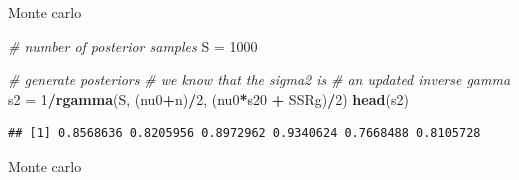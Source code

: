 \documentclass[ignorenonframetext,]{beamer}
\newenvironment{Shaded}{\begin{snugshade}}{\end{snugshade}}
\newcommand{\KeywordTok}[1]{\textcolor[rgb]{0.13,0.29,0.53}{\textbf{#1}}}
\newcommand{\DataTypeTok}[1]{\textcolor[rgb]{0.13,0.29,0.53}{#1}}
\newcommand{\DecValTok}[1]{\textcolor[rgb]{0.00,0.00,0.81}{#1}}
\newcommand{\StringTok}[1]{\textcolor[rgb]{0.31,0.60,0.02}{#1}}
\newcommand{\CommentTok}[1]{\textcolor[rgb]{0.56,0.35,0.01}{\textit{#1}}}
\newcommand{\OperatorTok}[1]{\textcolor[rgb]{0.81,0.36,0.00}{\textbf{#1}}}
\newcommand{\NormalTok}[1]{#1}
\begin{document}
\begin{frame}[fragile]{Monte carlo}

\begin{Shaded}
\begin{Highlighting}[]
\CommentTok{# number of posterior samples}
\NormalTok{S =}\StringTok{ }\DecValTok{1000}

\CommentTok{# generate posteriors}
\CommentTok{# we know that the sigma2 is}
\CommentTok{# an updated inverse gamma}
\NormalTok{s2 =}\StringTok{ }\DecValTok{1}\OperatorTok{/}\KeywordTok{rgamma}\NormalTok{(S, (nu0}\OperatorTok{+}\NormalTok{n)}\OperatorTok{/}\DecValTok{2}\NormalTok{, (nu0}\OperatorTok{*}\NormalTok{s20 }\OperatorTok{+}\StringTok{ }\NormalTok{SSRg)}\OperatorTok{/}\DecValTok{2}\NormalTok{)}
\KeywordTok{head}\NormalTok{(s2)}
\end{Highlighting}
\end{Shaded}

\begin{verbatim}
## [1] 0.8568636 0.8205956 0.8972962 0.9340624 0.7668488 0.8105728
\end{verbatim}

\end{frame}

\begin{frame}[fragile]{Monte carlo}

\begin{Shaded}
\end{Shaded}

\end{frame}
\end{document}
